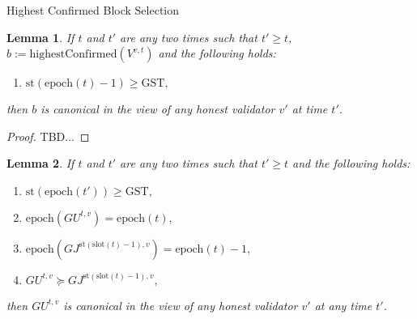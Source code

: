 \documentclass{article}
\newtheorem{lemma}{Lemma}
\begin{document}
\begin{algorithm}[H]
\SetAlgoNoLine
{}
\caption{Highest Confirmed Block Selection}
\end{algorithm}

\begin{lemma}
    If $t$ and $t'$ are any two times such that $t' \geq t$, $b := \text{highestConfirmed}(V^{v,t})$ and the following holds:
    
    \begin{enumerate}
        \item $\text{st}(\text{epoch}(t) - 1) \geq \text{GST},$
    \end{enumerate}
    
    then $b$ is canonical in the view of any honest validator $v'$ at time $t'$.
\end{lemma}

\begin{proof}
    TBD...
\end{proof}


\begin{lemma}
    If $t$ and $t'$ are any two times such that $t' \geq t$ and the following holds:
    
    \begin{enumerate}
        \item $\text{st}(\text{epoch}(t')) \geq \text{GST},$
        \item $\text{epoch}(GU^{t,v}) = \text{epoch}(t),$
        \item $\text{epoch}(GJ^{\text{st}(\text{slot}(t)-1),v}) = \text{epoch}(t) - 1,$
        \item $GU^{t,v} \succeq GJ^{\text{st}(\text{slot}(t)-1),v},$
    \end{enumerate}
    
then $GU^{t,v}$ is canonical in the view of any honest validator $v'$ at any time $t'$.
\end{lemma}
\end{document}
